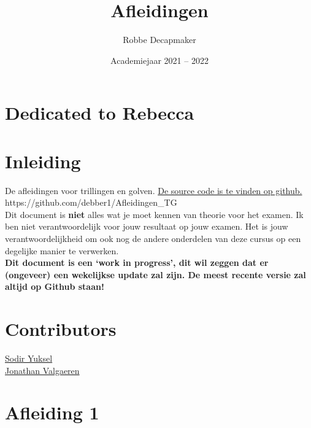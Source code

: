 \documentclass[a4paper,kul]{kulakarticle} %
\date{Academiejaar 2021 -- 2022}
\title{Afleidingen}
\author{Robbe Decapmaker}
\begin{document}
\maketitle
\section*{Dedicated to Rebecca}
\section*{Inleiding}

De afleidingen voor trillingen en golven. \href{https://github.com/debber1/Afleidingen_TG}{De source code is te vinden op github.}\\
https://github.com/debber1/Afleidingen\_TG\\
Dit document is \textbf{niet} alles wat je moet kennen van theorie voor het examen. Ik ben niet verantwoordelijk voor jouw resultaat op jouw examen. Het is jouw verantwoordelijkheid om ook nog de andere onderdelen van deze cursus op een degelijke manier te verwerken. \\
\textbf{Dit document is een `work in progress', dit wil zeggen dat er (ongeveer) een wekelijkse update zal zijn. De meest recente versie zal altijd op Github staan!}

\section*{Contributors}
\href{https://github.com/sydon1}{Sodir Yuksel} \\
\href{https://github.com/ItsAlphie}{Jonathan Valgaeren}

\section{Afleiding 1}
\end{document}
